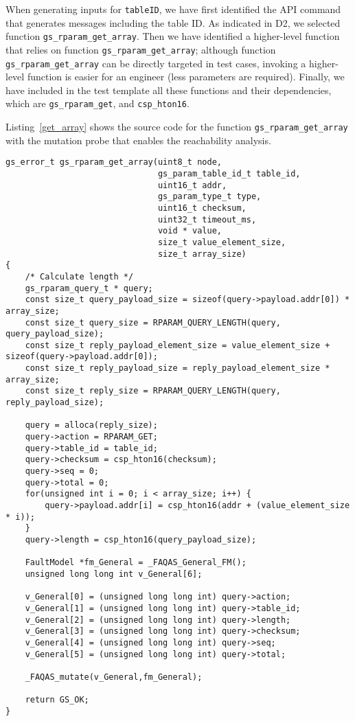 When generating inputs for \texttt{tableID}, we have first identified the API command that generates messages including the table ID. As indicated in D2, we selected function 
\texttt{gs\_rparam\_get\_array}. Then we have identified a higher-level function that relies on function 
\texttt{gs\_rparam\_get\_array}; although function \texttt{gs\_rparam\_get\_array} can be directly targeted in test cases, invoking a higher-level function is easier for an engineer (less parameters are required).
Finally, we have included in the test template all these functions and their dependencies, which are \texttt{gs\_rparam\_get}, and \texttt{csp\_hton16}. 

Listing~\ref{get_array} shows the source code for the function \texttt{gs\_rparam\_get\_array} with the mutation probe that enables the reachability analysis. 

\begin{lstlisting}[style=CStyle,float=t, caption=Instrumented code for function gs\_rparam\_get\_array., label=get_array]
gs_error_t gs_rparam_get_array(uint8_t node,
                               gs_param_table_id_t table_id,
                               uint16_t addr,
                               gs_param_type_t type,
                               uint16_t checksum,
                               uint32_t timeout_ms,
                               void * value,
                               size_t value_element_size,
                               size_t array_size)
{
    /* Calculate length */
    gs_rparam_query_t * query;
    const size_t query_payload_size = sizeof(query->payload.addr[0]) * array_size;
    const size_t query_size = RPARAM_QUERY_LENGTH(query, query_payload_size);
    const size_t reply_payload_element_size = value_element_size + sizeof(query->payload.addr[0]);
    const size_t reply_payload_size = reply_payload_element_size * array_size;
    const size_t reply_size = RPARAM_QUERY_LENGTH(query, reply_payload_size);

    query = alloca(reply_size);
    query->action = RPARAM_GET;
    query->table_id = table_id;
    query->checksum = csp_hton16(checksum);
    query->seq = 0;
    query->total = 0;
    for(unsigned int i = 0; i < array_size; i++) {
        query->payload.addr[i] = csp_hton16(addr + (value_element_size * i));
    }
    query->length = csp_hton16(query_payload_size);

    FaultModel *fm_General = _FAQAS_General_FM();
    unsigned long long int v_General[6];

    v_General[0] = (unsigned long long int) query->action;
    v_General[1] = (unsigned long long int) query->table_id;
    v_General[2] = (unsigned long long int) query->length;
    v_General[3] = (unsigned long long int) query->checksum;
    v_General[4] = (unsigned long long int) query->seq;
    v_General[5] = (unsigned long long int) query->total;

    _FAQAS_mutate(v_General,fm_General);

    return GS_OK;
}
\end{lstlisting}



